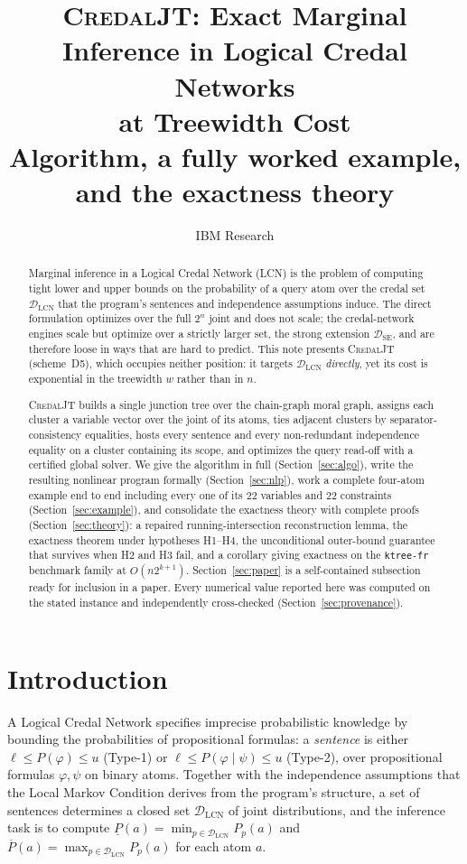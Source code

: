 \documentclass[11pt]{article}
\title{\textsc{CredalJT}: Exact Marginal Inference in Logical Credal Networks\\
at Treewidth Cost\\
\large Algorithm, a fully worked example, and the exactness theory}
\author{IBM Research}
\date{}
\theoremstyle{definition}
\newcommand{\lo}{\underline}
\newcommand{\hi}{\overline}
\newcommand{\DSE}{\mathcal{D}_{\mathrm{SE}}}
\newcommand{\DLCN}{\mathcal{D}_{\mathrm{LCN}}}
\begin{document}
\maketitle

\begin{abstract}
Marginal inference in a Logical Credal Network (LCN) is the problem of computing
tight lower and upper bounds on the probability of a query atom over the credal
set $\DLCN$ that the program's sentences and independence assumptions induce.
The direct formulation optimizes over the full $2^n$ joint and does not scale;
the credal-network engines scale but optimize over a strictly larger set, the
strong extension $\DSE$, and are therefore loose in ways that are hard to
predict. This note presents \textsc{CredalJT} (scheme~D5), which occupies
neither position: it targets $\DLCN$ \emph{directly}, yet its cost is
exponential in the treewidth $w$ rather than in $n$.

\textsc{CredalJT} builds a single junction tree over the chain-graph moral graph,
assigns each cluster a variable vector over the joint of its atoms, ties adjacent
clusters by separator-consistency equalities, hosts every sentence and every
non-redundant independence equality on a cluster containing its scope, and
optimizes the query read-off with a certified global solver. We give the
algorithm in full (Section~\ref{sec:algo}), write the resulting nonlinear program
formally (Section~\ref{sec:nlp}), work a complete four-atom example end to end
including every one of its $22$ variables and $22$ constraints
(Section~\ref{sec:example}), and consolidate the exactness theory with complete
proofs (Section~\ref{sec:theory}): a repaired running-intersection
reconstruction lemma, the exactness theorem under hypotheses H1--H4, the
unconditional outer-bound guarantee that survives when H2 and H3 fail, and a
corollary giving exactness on the \texttt{ktree-fr} benchmark family at
$O(n2^{k+1})$. Section~\ref{sec:paper} is a self-contained subsection ready for
inclusion in a paper. Every numerical value reported here was computed on the
stated instance and independently cross-checked (Section~\ref{sec:provenance}).
\end{abstract}

\tableofcontents

\section{Introduction}\label{sec:intro}

A Logical Credal Network specifies imprecise probabilistic knowledge by
bounding the probabilities of propositional formulas: a \emph{sentence} is either
$\ell\le P(\varphi)\le u$ (Type-1) or $\ell\le P(\varphi\mid\psi)\le u$
(Type-2), over propositional formulas $\varphi,\psi$ on binary atoms. Together
with the independence assumptions that the Local Markov Condition derives from
the program's structure, a set of sentences determines a closed set $\DLCN$ of
joint distributions, and the inference task is to compute
$\lo P(a)=\min_{p\in\DLCN}P_p(a)$ and $\hi P(a)=\max_{p\in\DLCN}P_p(a)$ for each
atom $a$.
\end{document}
